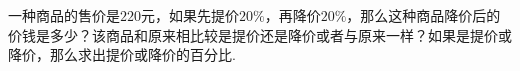 一种商品的售价是$220$元，如果先提价$20\%$，再降价$20\%$，那么这种商品降价后的价钱是多少？该商品和原来相比较是提价还是降价或者与原来一样？如果是提价或降价，那么求出提价或降价的百分比.